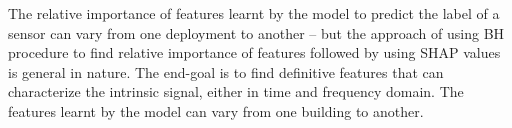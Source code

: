 The relative importance of features learnt by the model to predict the label of a sensor can vary from one deployment to another -- but the approach of using BH procedure to find relative importance of features followed by using SHAP values is general in nature. The end-goal is to find definitive features that can characterize the intrinsic signal, either in time and frequency domain. The features learnt by the model can vary from one building to another.